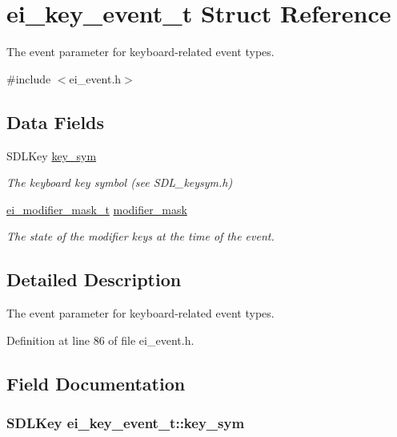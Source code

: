 \hypertarget{structei__key__event__t}{\section{ei\+\_\+key\+\_\+event\+\_\+t Struct Reference}
\label{structei__key__event__t}
}


The event parameter for keyboard-\/related event types.  




{\ttfamily \#include $<$ei\+\_\+event.\+h$>$}

\subsection*{Data Fields}
\begin{DoxyCompactItemize}
\item 
S\+D\+L\+Key \hyperlink{structei__key__event__t_a34be444e0f81bfa20e0b053779faf873}{key\+\_\+sym}
\begin{DoxyCompactList}\small\item\em The keyboard key symbol (see S\+D\+L\+\_\+keysym.\+h) \end{DoxyCompactList}\item 
\hyperlink{ei__event_8h_abcdd2ef0f39179463f17a06be9bdf949}{ei\+\_\+modifier\+\_\+mask\+\_\+t} \hyperlink{structei__key__event__t_a35e4dc6d788b9fdd4eeedf716662afab}{modifier\+\_\+mask}
\begin{DoxyCompactList}\small\item\em The state of the modifier keys at the time of the event. \end{DoxyCompactList}\end{DoxyCompactItemize}


\subsection{Detailed Description}
The event parameter for keyboard-\/related event types. 

Definition at line 86 of file ei\+\_\+event.\+h.



\subsection{Field Documentation}
\hypertarget{structei__key__event__t_a34be444e0f81bfa20e0b053779faf873}{
\subsubsection[{key\+\_\+sym}]{\setlength{\rightskip}{0pt plus 5cm}S\+D\+L\+Key ei\+\_\+key\+\_\+event\+\_\+t\+::key\+\_\+sym}}\label{structei__key__event__t_a34be444e0f81bfa20e0b053779faf873}



